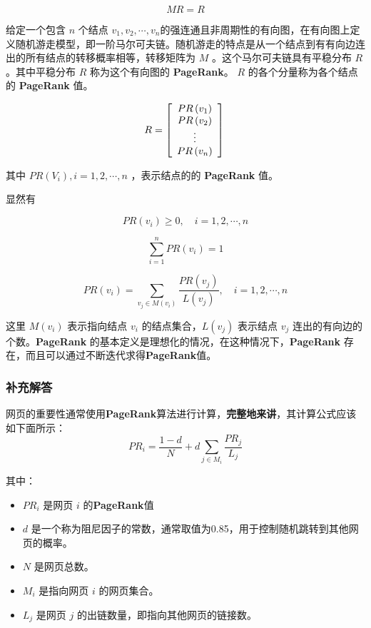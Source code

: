 \documentclass[a4,10pt,zihao=-4]{ctexart}
\begin{document}
$$
MR=R
$$

给定一个包含 $n$ 个结点 ${v_1},{v_2}, \cdots ,{v_n}$的强连通且非周期性的有向图，在有向图上定义随机游走模型，即一阶马尔可夫链。随机游走的特点是从一个结点到有有向边连出的所有结点的转移概率相等，转移矩阵为 $M$ 。这个马尔可夫链具有平稳分布 $R$。其中平稳分布 $R$ 称为这个有向图的 \textbf{PageRank}。 $R$ 的各个分量称为各个结点的 \textbf{PageRank} 值。

$$
R=\left[\begin{array}{c} P R\left(v_{1}\right) \\ P R\left(v_{2}\right) \\ \vdots \\ P R\left(v_{n}\right) \end{array}\right]\\
$$


其中 $PR(V_i) , i = 1,2, \cdots ,n$ ，表示结点的的 \textbf{PageRank} 值。

显然有

$$
P R\left(v_{i}\right) \geqslant 0, \quad i=1,2, \cdots, n 
$$

$$
\sum_{i=1}^{n} P R\left(v_{i}\right)=1 
$$


$$
P R\left(v_{i}\right)=\sum_{v_{j} \in M\left(v_{i}\right)} \frac{P R\left(v_{j}\right)}{L\left(v_{j}\right)}, \quad i=1,2, \cdots, n
$$

这里 $M(v_i)$ 表示指向结点 $v_i$ 的结点集合，$ L(v_j)$ 表示结点 $v_j$ 连出的有向边的个数。\textbf{PageRank} 的基本定义是理想化的情况，在这种情况下，\textbf{PageRank} 存在，而且可以通过不断迭代求得\textbf{PageRank}值。

\subsubsection{补充解答}

网页的重要性通常使用\textbf{PageRank}算法进行计算，\textbf{完整地来讲}，其计算公式应该如下面所示：
\[ PR_i = \frac{1 - d}{N} + d \sum_{j \in M_i} \frac{PR_j}{L_j} \]

其中：

\begin{itemize}
    \item \( PR_i \) 是网页 \( i \) 的\textbf{PageRank}值
    \item \( d \) 是一个称为阻尼因子的常数，通常取值为0.85，用于控制随机跳转到其他网页的概率。
    \item \( N \) 是网页总数。
    \item \( M_i \) 是指向网页 \( i \) 的网页集合。
    \item \( L_j \) 是网页 \( j \) 的出链数量，即指向其他网页的链接数。
\end{itemize}
\end{document}
